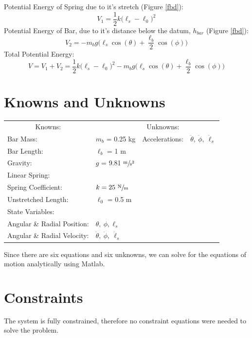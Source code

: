 \documentclass[12pt]{report}
\begin{document}
\begin{flushleft}
Potential Energy of Spring due to it's stretch (Figure \ref{fbd}):
$$V_1 = \frac{1}{2}k\big(\ell_s-\ell_0\big)^2$$
Potential Energy of Bar, due to it's distance below the datum, $h_{bar}$ (Figure \ref{fbd}):
$$V_2 = - m_bg\big(\ell_s\cos(\theta) + \frac{\ell_b}{2}\cos(\phi)\big)$$
Total Potential Energy:
\begin{equation}
V = V_1 + V_2 = \frac{1}{2}k\big(\ell_s-\ell_0\big)^2 - m_bg\big(\ell_s\cos(\theta) + \frac{\ell_b}{2}\cos(\phi)\big)
\end{equation}
\newpage
\section{Knowns and Unknowns} \label{knownsandunknowns}
\begin{tabular}{ll@{\hskip .75in}ll}
  \multicolumn{1}{c}{Knowns:} && \multicolumn{1}{c}{Unknowns:} \\
  Bar Mass: &$m_b$ = 0.25 kg & Accelerations: & $\ddot{\theta},~\ddot{\phi},~\ddot{\ell}_s$ \\
  Bar Length: &$\ell_b$ = 1 m & \\
  Gravity: &$g$ = 9.81 $\sfrac{\text{m}}{\text{s$^2$}}$& \\
  Linear Spring: \\
  \quad Spring Coefficient:& $k = 25~\sfrac{\text{N}}{\text{m}}$\\
  \quad Unstretched Length:& $\ell_0$ = 0.5 m \\
  State Variables: \\
  \quad Angular \& Radial Position: &$\theta,~\phi,\ell_s$ \\
  \quad Angular \& Radial Velocity: &$\dot{\theta},~\dot{\phi},~\dot{\ell}_s$ & \\
\end{tabular}
\vspace{2ex}

Since there are six equations and six unknowns, we can solve for the equations of
motion analytically using Matlab.

\section{Constraints}
The system is fully constrained, therefore no constraint equations were needed to
solve the problem.

\end{flushleft}
\end{document}
